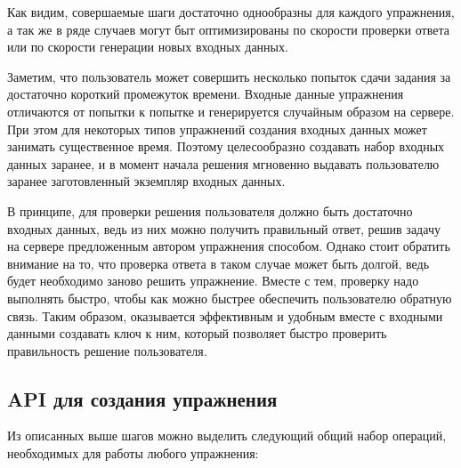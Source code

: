 \documentclass{matmex-diploma-custom}
\begin{document}
Как видим, совершаемые шаги достаточно однообразны для каждого
упражнения, а так же в ряде случаев могут быт оптимизированы по
скорости проверки ответа или по скорости генерации новых входных
данных.


Заметим, что пользователь может совершить несколько попыток сдачи
задания за достаточно короткий промежуток времени. Входные данные
упражнения отличаются от попытки к попытке и генерируется случайным
образом на сервере. При этом для некоторых типов упражнений создания
входных данных может занимать существенное время. Поэтому
целесообразно создавать набор входных данных заранее, и в момент
начала решения мгновенно выдавать пользователю заранее заготовленный
экземпляр входных данных.

В принципе, для проверки решения пользователя должно быть достаточно
входных данных, ведь из них можно получить правильный ответ, решив
задачу на сервере предложенным автором упражнения способом. Однако
стоит обратить внимание на то, что проверка ответа в таком случае
может быть долгой, ведь будет необходимо заново решить
упражнение. Вместе с тем, проверку надо выполнять быстро, чтобы как
можно быстрее обеспечить пользователю обратную связь. Таким образом,
оказывается эффективным и удобным вместе с входными данными создавать
ключ к ним, который позволяет быстро проверить правильность решение
пользователя.

\subsection{API для создания упражнения}
Из описанных выше шагов можно выделить следующий общий набор операций,
необходимых для работы любого упражнения:
\end{document}
